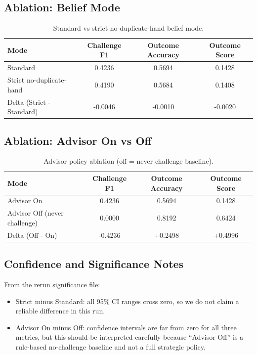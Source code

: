 \documentclass[11pt]{article}
\begin{document}
\subsection{Ablation: Belief Mode}
\begin{table}[H]
\centering
\caption{Standard vs strict no-duplicate-hand belief mode.}
\label{tab:ablation-belief}
\begin{tabular}{lccc}
\toprule
Mode & Challenge F1 & Outcome Accuracy & Outcome Score \\
\midrule
Standard & 0.4236 & 0.5694 & 0.1428 \\
Strict no-duplicate-hand & 0.4190 & 0.5684 & 0.1408 \\
Delta (Strict - Standard) & -0.0046 & -0.0010 & -0.0020 \\
\bottomrule
\end{tabular}
\end{table}

\subsection{Ablation: Advisor On vs Off}
\begin{table}[H]
\centering
\caption{Advisor policy ablation (off = never challenge baseline).}
\label{tab:ablation-advisor}
\begin{tabular}{lccc}
\toprule
Mode & Challenge F1 & Outcome Accuracy & Outcome Score \\
\midrule
Advisor On & 0.4236 & 0.5694 & 0.1428 \\
Advisor Off (never challenge) & 0.0000 & 0.8192 & 0.6424 \\
Delta (Off - On) & -0.4236 & +0.2498 & +0.4996 \\
\bottomrule
\end{tabular}
\end{table}

\subsection{Confidence and Significance Notes}
From the rerun significance file:
\begin{itemize}
  \item Strict minus Standard: all 95\% CI ranges cross zero, so we do not claim a reliable difference in this run.
  \item Advisor On minus Off: confidence intervals are far from zero for all three metrics, but this should be interpreted carefully because ``Advisor Off'' is a rule-based no-challenge baseline and not a full strategic policy.
\end{itemize}
\end{document}
